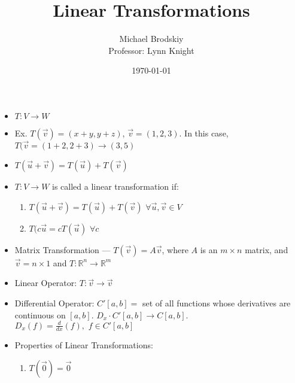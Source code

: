 \documentclass[12pt]{article}
\title{Linear Transformations}
\date{\today}
\author{Michael Brodskiy\\ \small Professor: Lynn Knight}
\begin{document}
\maketitle

\begin{itemize}

  \item $T: V\rightarrow W$

  \item Ex. $T(\overrightarrow{v})=(x+y,y+z)$, $\overrightarrow{v}=(1,2,3)$. In this case, $T(\overrightarrow{v}=(1+2,2+3)\rightarrow(3,5)$

    \item $T(\overrightarrow{u}+\overrightarrow{v})=T(\overrightarrow{u})+T(\overrightarrow{v})$

    \item $T:V\rightarrow W$ is called a linear transformation if:

      \begin{enumerate}

        \item $T(\overrightarrow{u}+\overrightarrow{v})=T(\overrightarrow{u})+T(\overrightarrow{v})\,\,\forall \overrightarrow{u},\overrightarrow{v}\in V$

        \item $T(c\overrightarrow{u}=cT(\overrightarrow{u})\,\,\forall c$

      \end{enumerate}

      \item Matrix Transformation — $T(\overrightarrow{v})=A\overrightarrow{v}$, where $A$ is an $m\times n$ matrix, and $\overrightarrow{v}=n\times1$ and $T: \mathbb{R}^n\rightarrow\mathbb{R}^m$

      \item Linear Operator: $T: \overrightarrow{v}\rightarrow\overrightarrow{v}$

      \item Differential Operator: $C'[a,b]=$ set of all functions whose derivatives are continuous on $[a,b]$. $D_x\cdot C'[a,b]\rightarrow C[a,b]$. $D_x(f)=\frac{d}{dx}(f),\,\,f\in C'[a,b]$

      \item Properties of Linear Transformations:

        \begin{enumerate}

          \item $T(\overrightarrow{0})=\overrightarrow{0}$


\end{enumerate}
\end{itemize}
\end{document}
